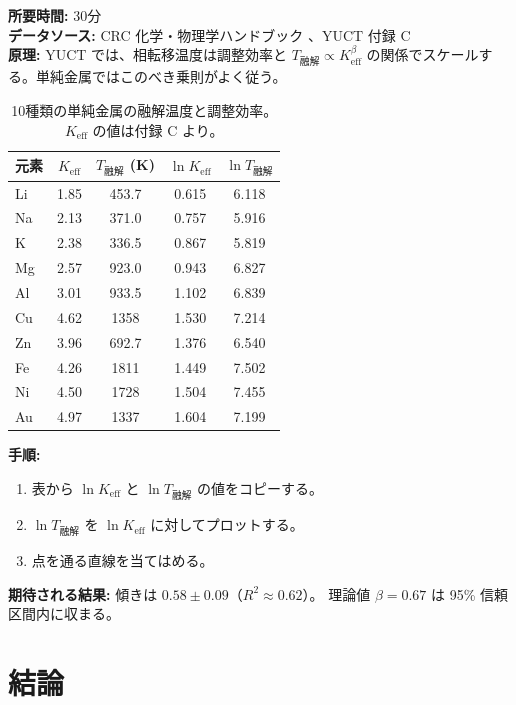 \documentclass[12pt,a4paper]{article}
\newcommand{\Ke}{K_{\mathrm{eff}}}
\begin{document}
	\textbf{所要時間:} 30分\\
	\textbf{データソース:} CRC 化学・物理学ハンドブック \cite{CRC}、YUCT 付録 C \cite{AppendixC}\\
	\textbf{原理:} YUCT では、相転移温度は調整効率と \(T_{\text{融解}} \propto \Ke^{\beta}\) の関係でスケールする。単純金属ではこのべき乗則がよく従う。
	
	\begin{table}[H]
		\centering
		\caption{10種類の単純金属の融解温度と調整効率。\(\Ke\) の値は付録 C より。}
		\label{tab:melting}
		\begin{tabular}{l c c c c}
			\toprule
			元素 & \(\Ke\) & \(T_{\text{融解}}\) (K) & \(\ln \Ke\) & \(\ln T_{\text{融解}}\) \\
			\midrule
			Li & 1.85 & 453.7 & 0.615 & 6.118 \\
			Na & 2.13 & 371.0 & 0.757 & 5.916 \\
			K  & 2.38 & 336.5 & 0.867 & 5.819 \\
			Mg & 2.57 & 923.0 & 0.943 & 6.827 \\
			Al & 3.01 & 933.5 & 1.102 & 6.839 \\
			Cu & 4.62 & 1358  & 1.530 & 7.214 \\
			Zn & 3.96 & 692.7 & 1.376 & 6.540 \\
			Fe & 4.26 & 1811  & 1.449 & 7.502 \\
			Ni & 4.50 & 1728  & 1.504 & 7.455 \\
			Au & 4.97 & 1337  & 1.604 & 7.199 \\
			\bottomrule
		\end{tabular}
	\end{table}
	
	\textbf{手順:}
	\begin{enumerate}[label=(\arabic*)]
		\item 表から \(\ln \Ke\) と \(\ln T_{\text{融解}}\) の値をコピーする。
		\item \(\ln T_{\text{融解}}\) を \(\ln \Ke\) に対してプロットする。
		\item 点を通る直線を当てはめる。
	\end{enumerate}
	
	\textbf{期待される結果:} 傾きは \(0.58 \pm 0.09\)（\(R^2 \approx 0.62\)）。
	理論値 \(\beta = 0.67\) は 95\% 信頼区間内に収まる。
	
	\section{結論}
	
\end{document}
